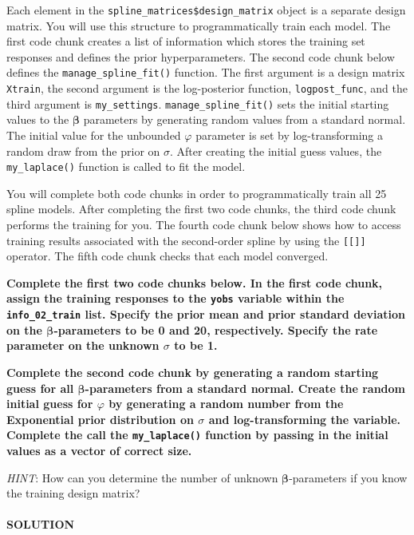 \documentclass[
]{article}
\begin{document}
Each element in the \texttt{spline\_matrices\$design\_matrix} object is
a separate design matrix. You will use this structure to
programmatically train each model. The first code chunk creates a list
of information which stores the training set responses and defines the
prior hyperparameters. The second code chunk below defines the
\texttt{manage\_spline\_fit()} function. The first argument is a design
matrix \texttt{Xtrain}, the second argument is the log-posterior
function, \texttt{logpost\_func}, and the third argument is
\texttt{my\_settings}. \texttt{manage\_spline\_fit()} sets the initial
starting values to the \(\boldsymbol{\beta}\) parameters by generating
random values from a standard normal. The initial value for the
unbounded \(\varphi\) parameter is set by log-transforming a random draw
from the prior on \(\sigma\). After creating the initial guess values,
the \texttt{my\_laplace()} function is called to fit the model.

You will complete both code chunks in order to programmatically train
all 25 spline models. After completing the first two code chunks, the
third code chunk performs the training for you. The fourth code chunk
below shows how to access training results associated with the
second-order spline by using the \texttt{{[}{[}{]}{]}} operator. The
fifth code chunk checks that each model converged.

\textbf{Complete the first two code chunks below. In the first code
chunk, assign the training responses to the \texttt{yobs} variable
within the \texttt{info\_02\_train} list. Specify the prior mean and
prior standard deviation on the \(\boldsymbol{\beta}\)-parameters to be
0 and 20, respectively. Specify the rate parameter on the unknown
\(\sigma\) to be 1.}

\textbf{Complete the second code chunk by generating a random starting
guess for all \(\boldsymbol{\beta}\)-parameters from a standard normal.
Create the random initial guess for \(\varphi\) by generating a random
number from the Exponential prior distribution on \(\sigma\) and
log-transforming the variable. Complete the call the
\texttt{my\_laplace()} function by passing in the initial values as a
vector of correct size.}

\emph{HINT}: How can you determine the number of unknown
\(\boldsymbol{\beta}\)-parameters if you know the training design
matrix?

\hypertarget{solution-14}{%
\paragraph{SOLUTION}\label{solution-14}}
\end{document}
